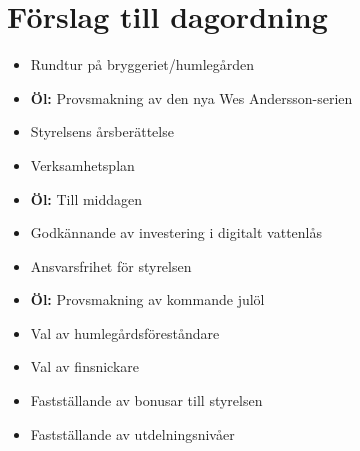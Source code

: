 \documentclass[a4paper,11pt,oneside]{article}
\begin{document}
\section*{\sffamily Förslag till dagordning}
\begin{itemize}
\item Rundtur på bryggeriet/humlegården
\item \textbf{Öl:} Provsmakning av den nya Wes Andersson-serien
\item Styrelsens årsberättelse
\item Verksamhetsplan
\item \textbf{Öl:} Till middagen
\item Godkännande av investering i digitalt vattenlås
\item Ansvarsfrihet för styrelsen
\item \textbf{Öl:} Provsmakning av kommande julöl
\item Val av humlegårdsföreståndare
\item Val av finsnickare
\item Fastställande av bonusar till styrelsen
\item Fastställande av utdelningsnivåer
\end{itemize}
\end{document}
